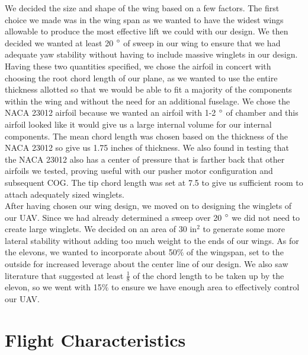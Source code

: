 We decided the size and shape of the wing based on a few factors. The first choice we made was in the wing span as we wanted to have the widest wings allowable to produce the most effective lift we could with our design. We then decided we wanted at least 20 $\degree$ of sweep in our wing to ensure that we had adequate yaw stability without having to include massive winglets in our design. Having these two quantities specified, we chose the airfoil in concert with choosing the root chord length of our plane, as we wanted to use the entire thickness allotted so that we would be able to fit a majority of the components within the wing and without the need for an additional fuselage. We chose the NACA 23012 airfoil because we wanted an airfoil with 1-2 $\degree$ of chamber and this airfoil looked like it would give us a large internal volume for our internal components. The mean chord length was chosen based on the thickness of the NACA 23012 so give us 1.75 inches of thickness. We also found in testing that the NACA 23012 also has a center of pressure that is farther back that other airfoils we tested, proving useful with our pusher motor configuration and subsequent COG. The tip chord length was set at 7.5 to give us sufficient room to attach adequately sized winglets. \\

After having chosen our wing design, we moved on to designing the winglets of our UAV. Since we had already determined a sweep over 20 $\degree$ we did not need to create large winglets. We decided on an area of 30 $\text{in}^2$ to generate some more lateral stability without adding too much weight to the ends of our wings. As for the elevons, we wanted to incorporate about 50$\percent$ of the wingspan, set to the outside for increased leverage about the center line of our design. We also saw literature that suggested at least $\frac{1}{8}$ of the chord length to be taken up by the elevon, so we went with 15$\percent$ to ensure we have enough area to effectively control our UAV.


\section{Flight Characteristics}

